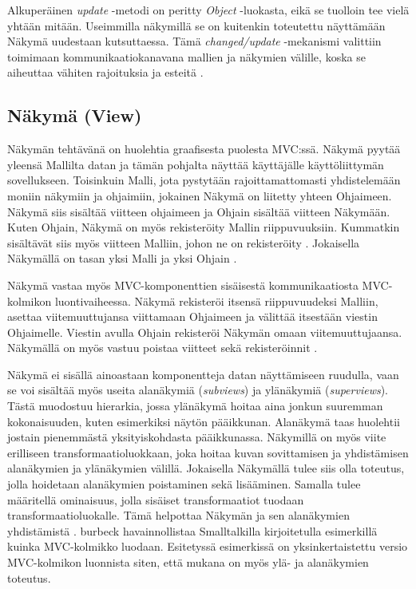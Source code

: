 \documentclass[utf8]{gradu3}
\begin{document}
Alkuperäinen \textit{update} -metodi on peritty \textit{Object} -luokasta, eikä se tuolloin tee vielä yhtään mitään. Useimmilla näkymillä se on kuitenkin toteutettu näyttämään Näkymä uudestaan kutsuttaessa. Tämä \textit{changed/update} -mekanismi valittiin toimimaan kommunikaatiokanavana mallien ja näkymien välille, koska se aiheuttaa vähiten rajoituksia ja esteitä \parencite{burbeck}. 

\subsection{Näkymä (View)}
Näkymän tehtävänä on huolehtia graafisesta puolesta MVC:ssä. Näkymä pyytää yleensä Mallilta datan ja tämän pohjalta näyttää käyttäjälle käyttöliittymän sovellukseen. Toisinkuin Malli, jota pystytään rajoittamattomasti yhdistelemään moniin näkymiin ja ohjaimiin, jokainen Näkymä on liitetty yhteen Ohjaimeen.  Näkymä siis sisältää viitteen ohjaimeen ja Ohjain sisältää viitteen Näkymään. Kuten Ohjain, Näkymä on myös rekisteröity Mallin riippuvuuksiin. Kummatkin sisältävät siis myös viitteen Malliin, johon ne on rekisteröity \parencite{burbeck}. Jokaisella Näkymällä on tasan yksi Malli ja yksi Ohjain \parencite[s. 7]{krasner_desc}.

Näkymä vastaa myös MVC-komponenttien sisäisestä kommunikaatiosta MVC-kolmikon luontivaiheessa. Näkymä rekisteröi itsensä riippuvuudeksi Malliin, asettaa viitemuuttujansa viittamaan Ohjaimeen ja välittää itsestään viestin Ohjaimelle. Viestin avulla Ohjain rekisteröi Näkymän omaan viitemuuttujaansa. Näkymällä on myös vastuu poistaa viitteet sekä rekisteröinnit \parencite{burbeck}. 

Näkymä ei sisällä ainoastaan komponentteja datan näyttämiseen ruudulla, vaan se voi sisältää myös useita alanäkymiä (\emph{subviews}) ja ylänäkymiä (\emph{superviews}). Tästä muodostuu hierarkia, jossa ylänäkymä hoitaa aina jonkun suuremman kokonaisuuden, kuten esimerkiksi näytön pääikkunan. Alanäkymä taas huolehtii jostain pienemmästä yksityiskohdasta pääikkunassa. Näkymillä on myös viite erilliseen transformaatioluokkaan, joka hoitaa kuvan sovittamisen ja yhdistämisen alanäkymien ja ylänäkymien välillä. Jokaisella Näkymällä tulee siis olla toteutus, jolla hoidetaan alanäkymien poistaminen sekä lisääminen. Samalla tulee määritellä ominaisuus, jolla sisäiset transformaatiot tuodaan transformaatioluokalle. Tämä helpottaa Näkymän ja sen alanäkymien yhdistämistä \parencite[s. 8]{krasner_desc}. burbeck havainnollistaa Smalltalkilla kirjoitetulla esimerkillä kuinka MVC-kolmikko luodaan. Esitetyssä esimerkissä on yksinkertaistettu versio MVC-kolmikon luonnista siten, että mukana on myös ylä- ja alanäkymien toteutus.
\end{document}
